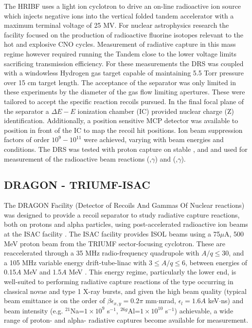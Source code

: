The HRIBF uses a light ion cyclotron to drive an on-line radioactive ion source which injects negative ions into the vertical folded tandem accelerator with a maximum terminal voltage of 25 MV. For nuclear astrophysics research the facility focused on the production of radioactive fluorine isotopes relevant to the hot and explosive CNO cycles. Measurement of radiative capture in this mass regime however required running the Tandem close to the lower voltage limits sacrificing transmission efficiency. For these measurements the DRS was coupled with a windowless Hydrogen gas target capable of maintaining 5.5 Torr pressure over 15 cm target length. The acceptance of the separator was only limited in these experiments by the diameter of the gas flow limiting apertures. These were tailored to accept the specific reaction recoils pursued. In the final focal plane of the separator a $\Delta{}E-E$ ionization chamber (IC) provided nuclear charge (Z) identification. Additionally, a position sensitive MCP detector was available to position in front of the IC to map the recoil hit positions. Ion beam suppression factors of order $10^9 - 10^{11}$ were achieved, varying with beam energies and conditions. The DRS was tested with proton capture on stable ,  and  and used for measurement of the radioactive beam reactions (,$\gamma$) and (,$\gamma$). 


\subsection{DRAGON - TRIUMF-ISAC}
The DRAGON Facility (Detector of Recoils And Gammas Of Nuclear reactions) was designed to provide a recoil separator to study radiative capture reactions, both on protons and alpha particles, using post-accelerated radioactive ion beams at the ISAC facility \cite{hut03a,hut03,eng05}. The ISAC facility \cite{ball11} provides ISOL beams using a 75$\mu$A, 500 MeV proton beam from the TRIUMF sector-focusing cyclotron. These are reaccelerated through a 35 MHz radio-frequency quadrupole with $A/q\leq30$, and a 105 MHz variable energy drift-tube-linac with $3\leq A/q\leq6$, between energies of 0.15$A$ MeV and 1.5$A$ MeV \cite{lax02}.  This energy regime, particularly the lower end, is well-suited to performing radiative capture reactions of the type occurring in classical novae and type 1 X-ray bursts, and given the high beam quality (typical beam emittance is on the order of  $\beta\epsilon_{x,y}=0.2\pi$ mm$\cdot$mrad, $\epsilon_{l}=1.6A$ keV$\cdot$ns) and beam intensity (e.g. $^{21}$Na=$1\times10^{9}$ s$^{-1}$, $^{26g}$Al=$1\times10^{10}$ s$^{-1}$) achievable, a wide range of proton- and alpha- radiative captures become available for measurement. 

